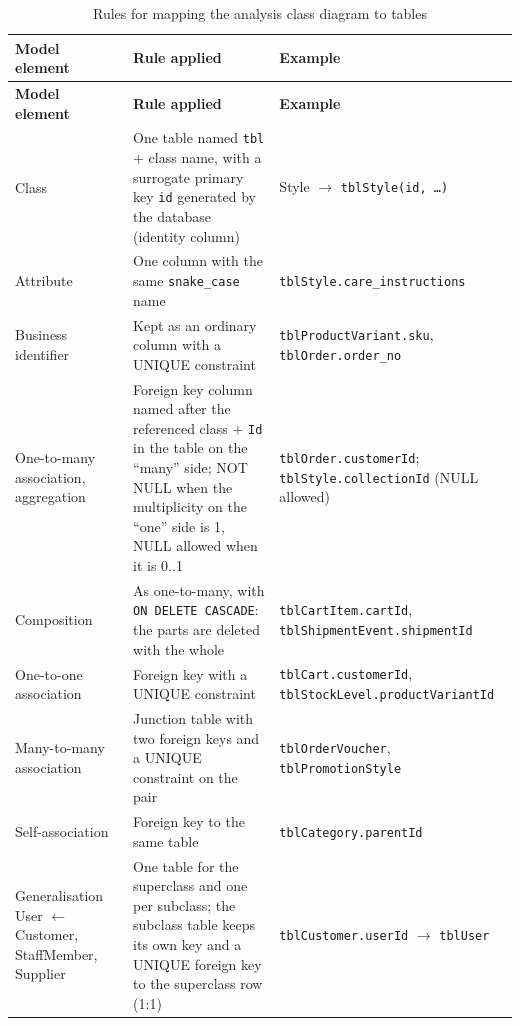 {\small
\begin{xltabular}{\textwidth}{@{}L{3.3cm} Y L{4.2cm}@{}}
\caption{Rules for mapping the analysis class diagram to tables}\label{tab:mappingrules}\\
\toprule
\textbf{Model element} & \textbf{Rule applied} & \textbf{Example} \\ \midrule
\endfirsthead
\toprule
\textbf{Model element} & \textbf{Rule applied} & \textbf{Example} \\ \midrule
\endhead
\bottomrule
\endlastfoot
Class & One table named \texttt{tbl} + class name, with a surrogate primary key \texttt{id} generated by the database (identity column) & \textsf{Style} $\rightarrow$ \texttt{tblStyle(id, \ldots)} \\
Attribute & One column with the same \texttt{snake\_case} name & \texttt{tblStyle.\allowbreak care\_instructions} \\
Business identifier & Kept as an ordinary column with a UNIQUE constraint & \texttt{tblProductVariant.\allowbreak sku}, \texttt{tblOrder.\allowbreak order\_no} \\
One-to-many association, aggregation & Foreign key column named after the referenced class + \texttt{Id} in the table on the ``many'' side; NOT NULL when the multiplicity on the ``one'' side is 1, NULL allowed when it is 0..1 & \texttt{tblOrder.\allowbreak customerId}; \texttt{tblStyle.\allowbreak collectionId} (NULL allowed) \\
Composition & As one-to-many, with \texttt{ON DELETE CASCADE}: the parts are deleted with the whole & \texttt{tblCartItem.\allowbreak cartId}, \texttt{tblShipmentEvent.\allowbreak shipmentId} \\
One-to-one association & Foreign key with a UNIQUE constraint & \texttt{tblCart.\allowbreak customerId}, \texttt{tblStockLevel.\allowbreak productVariantId} \\
Many-to-many association & Junction table with two foreign keys and a UNIQUE constraint on the pair & \texttt{tblOrderVoucher}, \texttt{tblPromotionStyle} \\
Self-association & Foreign key to the same table & \texttt{tblCategory.\allowbreak parentId} \\
Generalisation \textsf{User} $\leftarrow$ \textsf{Customer}, \textsf{StaffMember}, \textsf{Supplier} & One table for the superclass and one per subclass; the subclass table keeps its own key and a UNIQUE foreign key to the superclass row (1:1) & \texttt{tblCustomer.\allowbreak userId} $\rightarrow$ \texttt{tblUser} \\

\end{xltabular}}
